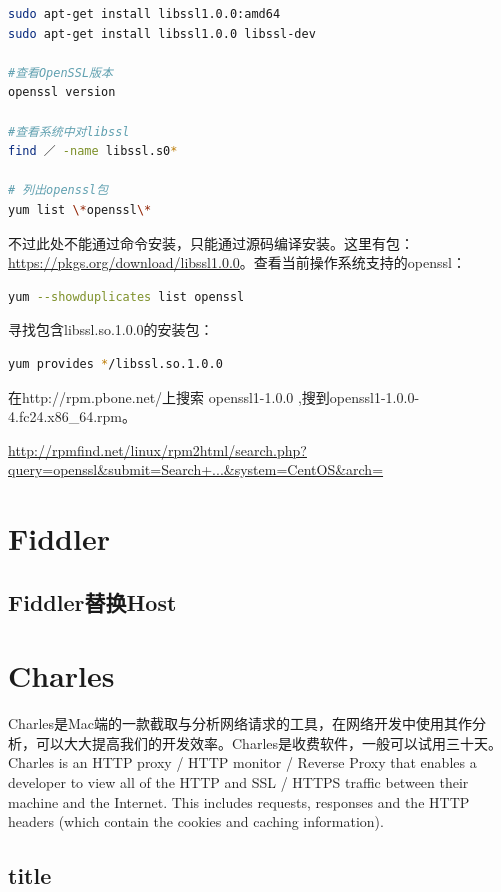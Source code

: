 \documentclass[letter]{book}
\begin{document}
\begin{lstlisting}[language=bash]
sudo apt-get install libssl1.0.0:amd64
sudo apt-get install libssl1.0.0 libssl-dev

#查看OpenSSL版本
openssl version

#查看系统中对libssl
find ／ -name libssl.s0*

# 列出openssl包
yum list \*openssl\*
\end{lstlisting}

不过此处不能通过命令安装，只能通过源码编译安装。这里有包： \url{https://pkgs.org/download/libssl1.0.0}。查看当前操作系统支持的openssl：

\begin{lstlisting}[language=bash]
yum --showduplicates list openssl
\end{lstlisting}

寻找包含libssl.so.1.0.0的安装包：

\begin{lstlisting}[language=bash]
yum provides */libssl.so.1.0.0
\end{lstlisting}

在http://rpm.pbone.net/上搜索 openssl1-1.0.0 ,搜到openssl1-1.0.0-4.fc24.x86\_64.rpm。

\url{http://rpmfind.net/linux/rpm2html/search.php?query=openssl&submit=Search+...&system=CentOS&arch=}

\section{Fiddler}

\subsection{Fiddler替换Host}

\section{Charles}

Charles是Mac端的一款截取与分析网络请求的工具，在网络开发中使用其作分析，可以大大提高我们的开发效率。Charles是收费软件，一般可以试用三十天。Charles is an HTTP proxy / HTTP monitor / Reverse Proxy that enables a developer to view all of the HTTP and SSL / HTTPS traffic between their machine and the Internet. This includes requests, responses and the HTTP headers (which contain the cookies and caching information).

\subsection{title}
\end{document}

